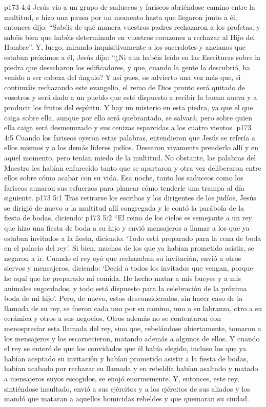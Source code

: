 \vs p173 4:4 Jesús vio a un grupo de saduceos y fariseos abriéndose camino entre la multitud, e hizo una pausa por un momento hasta que llegaron junto a él, entonces dijo: “Sabéis de qué manera vuestros padres rechazaron a los profetas, y sabéis bien que habéis determinado en vuestros corazones a rechazar al Hijo del Hombre”. Y, luego, mirando inquisitivamente a los sacerdotes y ancianos que estaban próximos a él, Jesús dijo: “¿Ni aun habéis leído en las Escrituras sobre la piedra que desecharon los edificadores, y que, cuando la gente la descubrió, ha venido a ser cabeza del ángulo? Y así pues, os advierto una vez más que, si continuáis rechazando este evangelio, el reino de Dios pronto será quitado de vosotros y será dado a un pueblo que esté dispuesto a recibir la buena nueva y a producir los frutos del espíritu. Y hay un misterio en esta piedra, ya que el que caiga sobre ella, aunque por ello será quebrantado, se salvará; pero sobre quien ella caiga será desmenuzado y sus cenizas esparcidas a los cuatro vientos.
\vs p173 4:5 Cuando los fariseos oyeron estas palabras, entendieron que Jesús se refería a ellos mismos y a los demás líderes judíos. Desearon vivamente prenderlo allí y en aquel momento, pero tenían miedo de la multitud. No obstante, las palabras del Maestro les habían enfurecido tanto que se apartaron y otra vez deliberaron entre ellos sobre cómo acabar con su vida. Esa noche, tanto los saduceos como los fariseos aunaron sus esfuerzos para planear cómo tenderle una trampa al día siguiente.
\vs p173 5:1 Tras retirarse los escribas y los dirigentes de los judíos, Jesús se dirigió de nuevo a la multitud allí congregada y le contó la parábola de la fiesta de bodas, diciendo:
\vs p173 5:2 \pc “El reino de los cielos es semejante a un rey que hizo una fiesta de boda a su hijo y envió mensajeros a llamar a los que ya estaban invitados a la fiesta, diciendo: ‘Todo está preparado para la cena de boda en el palacio del rey’. Si bien, muchos de los que ya habían prometido asistir, se negaron a ir. Cuando el rey oyó que rechazaban su invitación, envió a otros siervos y mensajeros, diciendo: ‘Decid a todos los invitados que vengan, porque he aquí que he preparado mi comida. He hecho matar a mis bueyes y a mis animales engordados, y todo está dispuesto para la celebración de la próxima boda de mi hijo’. Pero, de nuevo, estos desconsiderados, sin hacer caso de la llamada de su rey, se fueron cada uno por su camino, uno a su labranza, otro a su cerámica y otros a sus negocios. Otros además no se contentaron con menospreciar esta llamada del rey, sino que, rebelándose abiertamente, tomaron a los mensajeros y los escarnecieron, matando además a algunos de ellos. Y cuando el rey se enteró de que los convidados que él había elegido, incluso los que ya habían aceptado su invitación y habían prometido asistir a la fiesta de bodas, habían acabado por rechazar su llamada y en rebeldía habían asaltado y matado a mensajeros suyos escogidos, se enojó enormemente. Y, entonces, este rey, sintiéndose insultado, envió a sus ejércitos y a los ejércitos de sus aliados y los mandó que mataran a aquellos homicidas rebeldes y que quemaran su ciudad.
